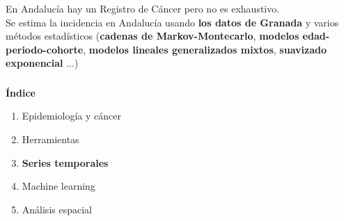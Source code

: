 \documentclass{beamer}
\begin{document}
\begin{frame}
\centering
En Andalucía hay un Registro de Cáncer pero no es exhaustivo.\\

Se estima la incidencia en Andalucía usando \textbf{los datos de Granada} y varios métodos estadísticos (\textbf{cadenas de Markov-Montecarlo}, \textbf{modelos edad-periodo-cohorte}, \textbf{modelos lineales generalizados mixtos}, \textbf{suavizado exponencial} ...)
	
\end{frame}

\begin{frame}\frametitle{}
	
	\Large{\textbf{Índice}}\\[2ex]
	\normalsize
	\begin{enumerate}
		\item Epidemiología y cáncer\\[2ex]
		\item Herramientas\\[2ex]
		\item \textbf{Series temporales} \\[2ex]
		\item Machine learning  \\[2ex]
		\item Análisis espacial \\[2ex]
	\end{enumerate}
	
\end{frame}

\end{document}
